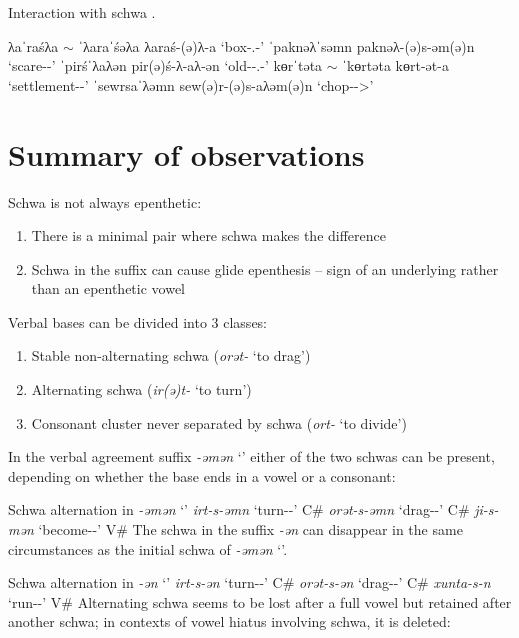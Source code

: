 \documentclass[a4paper, 12pt]{article}
\begin{document}
	\noindent Interaction with schwa \parencite{tyutyunnikova2023}.
	
	\pex
	\a λaˈraśλa $\sim$ ˈλaraˈśəλa \hfill λaraś-(ə)λ-a `box-{\Poss}.{\Tsg}-{\Dat}'
	\a ˈpaknəλˈsəmn \hfill paknəλ-(ə)s-əm(ə)n `scare-{\Pst}-{\Tdu}'
	\a ˈpirśˈλaλən \hfill pir(ə)ś-λ-aλ-ən `old-{\Pl}-{\Poss}.{\Tsg}-{\Loc}'
	\a kɵrˈtəta $\sim$ ˈkɵrtəta \hfill kɵrt-ət-a `settlement-{\Pl}-{\Dat}'
	\a ˈsewrsaˈλəmn \hfill sew(ə)r-(ə)s-aλəm(ə)n `chop-{\Pst}-{\Fdu}>{\Nsg}'
	\xe
	
	\section{Summary of observations}

	Schwa is not always epenthetic:
	
\begin{enumerate}[$\gg$]
	\item There is a minimal pair where schwa makes the difference
	\item Schwa in the suffix can cause glide epenthesis -- sign of an underlying rather than an epenthetic vowel
\end{enumerate}
	Verbal bases can be divided into 3 classes:
	
\begin{enumerate}[$\gg$]
	\item Stable non-alternating schwa (\emph{orət-} `to drag')
	\item Alternating schwa (\emph{ir(ə)t-} `to turn')
	\item Consonant cluster never separated by schwa (\emph{ort-} `to divide')
\end{enumerate}
	In the verbal agreement suffix \emph{-əmən} `{\Fdu}' either of the two schwas can be present, depending on whether the base ends in a vowel or a consonant:
	
	\pex Schwa alternation in \emph{-əmən} `{\Fdu}'
		\a \emph{irt-s-əmn} `turn-{\Pst}-{\Fdu}' \hfill C\#
		\a \emph{orət-s-əmn} `drag-{\Pst}-{\Fdu}' \hfill C\#
		\a \emph{ji-s-mən} `become-{\Pst}-{\Fdu}' \hfill V\#
	\xe
	The schwa in the {\Ssg} suffix \emph{-ən} can disappear in the same circumstances as the initial schwa of \emph{-əmən} `{\Fdu}'.
	
	\pex Schwa alternation in \emph{-ən} `{\Ssg}'
		\a \emph{irt-s-ən} `turn-{\Pst}-{\Fdu}' \hfill C\#
		\a \emph{orət-s-ən} `drag-{\Pst}-{\Fdu}' \hfill C\#
		\a \emph{xunta-s-n} `run-{\Pst}-{\Fdu}' \hfill V\#
	\xe
	Alternating schwa seems to be lost after a full vowel but retained after another schwa; in contexts of vowel hiatus involving schwa, it is deleted:
	
\end{document}
